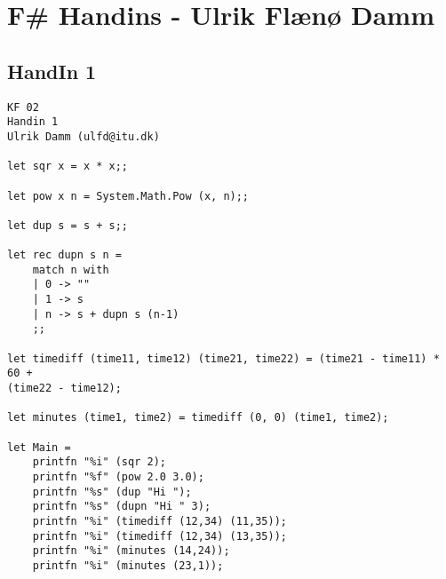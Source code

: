 \section{F\# Handins - Ulrik Flænø Damm}
\label{Appendix_FSharp_Ulrik}

\subsection{HandIn 1}
\label{Appendix_FSharp_Ulrik_1}
\begin{lstlisting}
KF 02
Handin 1
Ulrik Damm (ulfd@itu.dk)

let sqr x = x * x;;

let pow x n = System.Math.Pow (x, n);;

let dup s = s + s;;

let rec dupn s n =
	match n with
	| 0 -> ""
	| 1 -> s
	| n -> s + dupn s (n-1)
	;;

let timediff (time11, time12) (time21, time22) = (time21 - time11) * 60 + 
(time22 - time12);

let minutes (time1, time2) = timediff (0, 0) (time1, time2);

let Main =
	printfn "%i" (sqr 2);
	printfn "%f" (pow 2.0 3.0);
	printfn "%s" (dup "Hi ");
	printfn "%s" (dupn "Hi " 3);
	printfn "%i" (timediff (12,34) (11,35));
	printfn "%i" (timediff (12,34) (13,35));
	printfn "%i" (minutes (14,24));
	printfn "%i" (minutes (23,1));
\end{lstlisting}
